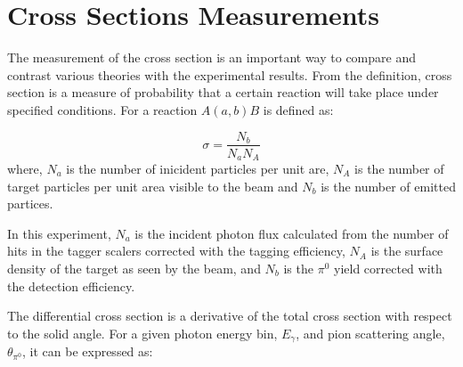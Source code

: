 


\section{Cross Sections Measurements}

\indent The measurement of the cross section is an important way to compare and contrast various theories with the experimental results. From the definition, cross section is a measure of probability that a certain reaction will take place under specified conditions. For a reaction $A(a,b)B$ is defined as:

\begin{equation}
\sigma = \frac{N_{b}}{N_{a}N_{A}}
\end{equation}
where, $N_{a}$ is the number of inicident particles per unit are, $N_{A}$ is the number of target particles per unit area visible to the beam and $N_{b}$ is the number of emitted partices.

\indent In this experiment, $N_{a}$ is the incident photon flux calculated from the number of hits in the tagger scalers corrected with the tagging efficiency, $N_{A}$ is the surface density of the target as seen by the beam, and $N_{b}$ is the $\pi^{0}$ yield corrected with the detection efficiency.

\indent The differential cross section is a derivative of the total cross section with respect to the solid angle. For a given photon energy bin, $E_{\gamma}$, and pion scattering angle, $\theta_{\pi^{0}}$, it can be expressed as:

